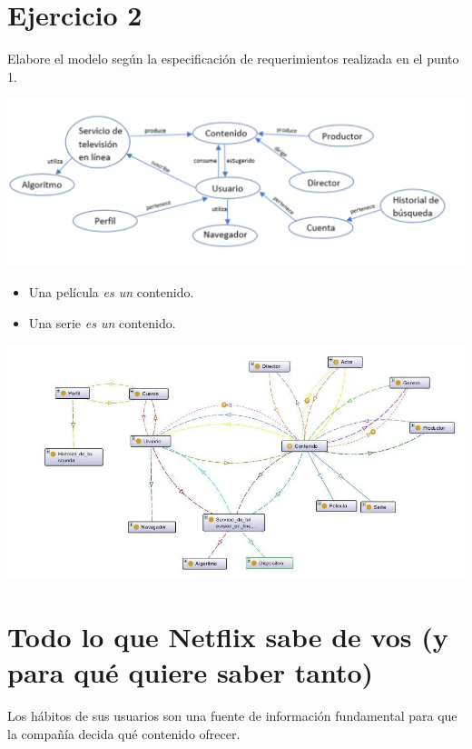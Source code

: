\documentclass[a4paper,10pt,twoside,final,spanish]{article}
\begin{document}
\section*{Ejercicio 2}

Elabore el modelo según la especificación de requerimientos realizada en el punto 1.

\dotfill

\begin{center}
\includegraphics[width=\linewidth]{modelo2}
\end{center}

\begin{itemize}
\item Una película \textit{es un} contenido.
\item Una serie \textit{es un} contenido.
\end{itemize}

\begin{center}
\includegraphics[width=\linewidth]{modelo3}
\end{center}

\section*{Todo lo que Netflix sabe de vos (y para qué quiere saber tanto)}

Los hábitos de sus usuarios son una fuente de información fundamental para que la compañía decida qué contenido ofrecer.
\end{document}
